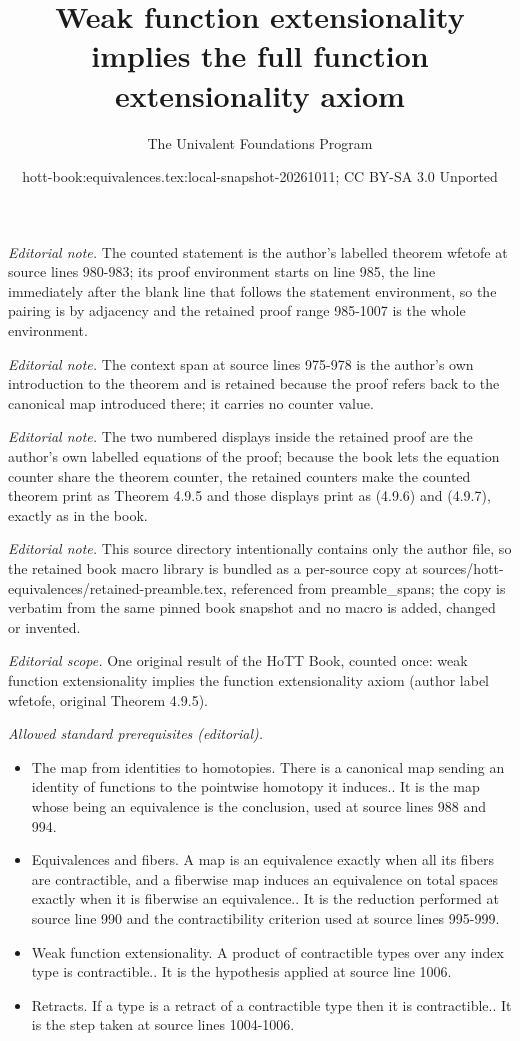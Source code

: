 \documentclass[10pt,a4paper]{article}
\title{Weak function extensionality implies the full function extensionality axiom}
\author{The Univalent Foundations Program}
\date{hott-book:equivalences.tex:local-snapshot-20261011; CC BY-SA 3.0 Unported}
\newcounter{chapter}
\theoremstyle{definition}
\theoremstyle{remark}
\numberwithin{equation}{section}
\begin{document}
\maketitle
\setcounter{chapter}{4}
\setcounter{section}{9}
\setcounter{thm}{4}
\noindent\textit{Editorial note.} The counted statement is the author's labelled theorem wfetofe at source lines 980-983; its proof environment starts on line 985, the line immediately after the blank line that follows the statement environment, so the pairing is by adjacency and the retained proof range 985-1007 is the whole environment.\par\medskip
\noindent\textit{Editorial note.} The context span at source lines 975-978 is the author's own introduction to the theorem and is retained because the proof refers back to the canonical map introduced there; it carries no counter value.\par\medskip
\noindent\textit{Editorial note.} The two numbered displays inside the retained proof are the author's own labelled equations of the proof; because the book lets the equation counter share the theorem counter, the retained counters make the counted theorem print as Theorem 4.9.5 and those displays print as (4.9.6) and (4.9.7), exactly as in the book.\par\medskip
\noindent\textit{Editorial note.} This source directory intentionally contains only the author file, so the retained book macro library is bundled as a per-source copy at sources/hott-equivalences/retained-preamble.tex, referenced from preamble\_spans; the copy is verbatim from the same pinned book snapshot and no macro is added, changed or invented.\par\medskip
\noindent\textit{Editorial scope.} One original result of the HoTT Book, counted once: weak function extensionality implies the function extensionality axiom (author label wfetofe, original Theorem 4.9.5).\par\medskip
\noindent\textit{Allowed standard prerequisites (editorial).}\begin{itemize}
\item The map from identities to homotopies. There is a canonical map sending an identity of functions to the pointwise homotopy it induces.. It is the map whose being an equivalence is the conclusion, used at source lines 988 and 994.
\item Equivalences and fibers. A map is an equivalence exactly when all its fibers are contractible, and a fiberwise map induces an equivalence on total spaces exactly when it is fiberwise an equivalence.. It is the reduction performed at source line 990 and the contractibility criterion used at source lines 995-999.
\item Weak function extensionality. A product of contractible types over any index type is contractible.. It is the hypothesis applied at source line 1006.
\item Retracts. If a type is a retract of a contractible type then it is contractible.. It is the step taken at source lines 1004-1006.
\end{itemize}\medskip
\end{document}
